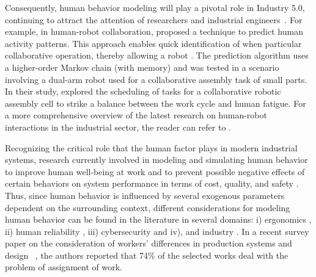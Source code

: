 \documentclass[review,12pt, 3p, times]{elsarticle}
\begin{document}
Consequently, human behavior modeling will play a pivotal role in Industry 5.0, continuing to attract the attention of  researchers and industrial engineers~\citep{panagou2023scoping}.
For example, in human-robot collaboration, \citep{zanchettin2018} proposed a technique to predict human activity patterns. This approach enables  quick identification of when  particular collaborative operation, thereby allowing a robot . The prediction algorithm uses a higher-order Markov chain (with memory) and was tested in a scenario involving a dual-arm robot used for a collaborative assembly task of small parts. In their study, \citep{zhang2021task} explored the scheduling of tasks for a collaborative robotic assembly cell to strike a balance between the work cycle and human fatigue. For a more comprehensive overview of the latest research on human-robot interactions in the industrial sector, the reader can refer to \citep{hjorth2022human, liu2022application, vicentini2021collaborative, hentout2019human}.
	
Recognizing the critical role that the human factor plays in modern industrial systems,  research  currently involved in modeling and simulating human behavior to improve human well-being at work and to prevent possible negative effects of certain behaviors on system performance in terms of cost, quality, and safety \citep{Jahanmahin2022}.
Thus, since human behavior is influenced by several exogenous parameters dependent on the surrounding context, different considerations for modeling human behavior can be found in the literature in several domains:  i) ergonomics \citep{ferjani2015,ferjani2017, Berlin2017, Greig2019}, ii) human reliability \citep{Azarkhil2014,DiPasquale2013,Dantan2020}, iii) cybersecurity \citep{Upadhyay2022,SanchezAguayo2021,Domarkiene2021,Moallem2021} and iv), and industry \citep{Schia2019,Kong2020,Mossa2015}. In a recent survey paper on the consideration of workers’ differences in production systems and design ~\cite{Katiraee2021a}, the authors reported that 74\% of the selected works deal with the problem of assignment of work. 
\end{document}
